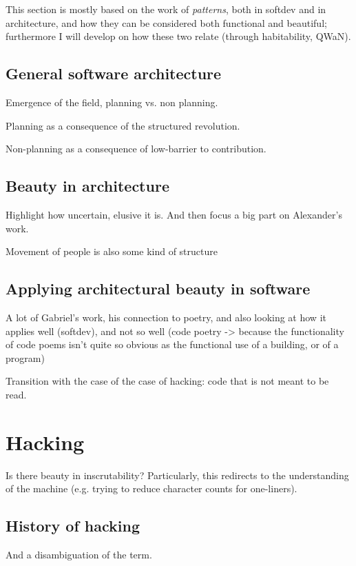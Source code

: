 \documentclass{article}
\begin{document}
This section is mostly based on the work of \emph{patterns}, both in softdev and in architecture, and how they can be considered both functional and beautiful; furthermore I will develop on how these two relate (through habitability, QWaN).

\subsection{General software architecture}

Emergence of the field, planning vs. non planning.

Planning as a consequence of the structured revolution.

Non-planning as a consequence of low-barrier to contribution.

\subsection{Beauty in architecture}

Highlight how uncertain, elusive it is. And then focus a big part on Alexander's work.

Movement of people is also some kind of structure

\subsection{Applying architectural beauty in software}

A lot of Gabriel's work, his connection to poetry, and also looking at how it applies well (softdev), and not so well (code poetry -> because the functionality of code poems isn't quite so obvious as the functional use of a building, or of a program)

Transition with the case of the case of hacking: code that is not meant to be read.

\section{Hacking}

Is there beauty in inscrutability? Particularly, this redirects to the understanding of the machine (e.g. trying to reduce character counts for one-liners).

\subsection{History of hacking}

And a disambiguation of the term.
\end{document}
